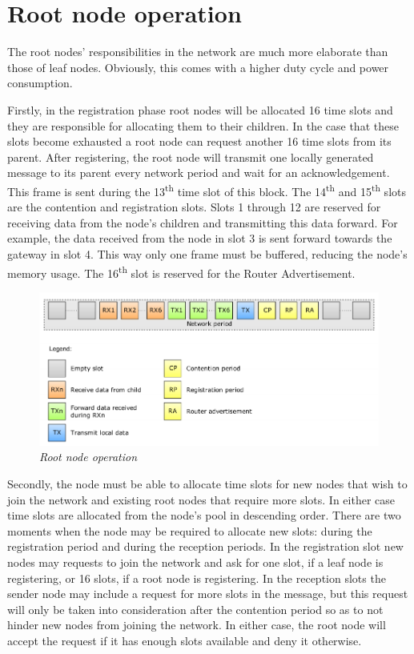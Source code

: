 \section{Root node operation}
\label{sec:root_node_operation}

The root nodes' responsibilities in the network are much more elaborate than
those of leaf nodes. Obviously, this comes with a higher duty cycle and power
consumption. 

Firstly, in the registration phase root nodes will be allocated 16 time slots
and they are responsible for allocating them to their children. In the case
that these slots become exhausted a root node can request another 16 time slots
from its parent. After registering, the root node will transmit one locally
generated message to its parent every network period and wait for an
acknowledgement. This frame is sent during the 13\textsuperscript{th} time slot
of this block. The 14\textsuperscript{th} and 15\textsuperscript{th} slots are
the contention and registration slots. Slots 1 through 12 are reserved for
receiving data from the node's children and transmitting this data forward. For
example, the data received from the node in slot 3 is sent forward towards the
gateway in slot 4. This way only one frame must be buffered, reducing the
node's memory usage. The 16\textsuperscript{th} slot is reserved for the Router
Advertisement.

\begin{figure}[ht]
	\begin{center}
		\includegraphics[width=\textwidth]{img/root_node_operation.pdf}
	\end{center}
	\caption{\small \itshape{Root node operation}}
\end{figure}

Secondly, the node must be able to allocate time slots for new nodes that wish
to join the network and existing root nodes that require more slots. In either
case time slots are allocated from the node's pool in descending order. There
are two moments when the node may be required to allocate new slots: during the
registration period and during the reception periods. In the registration slot
new nodes may requests to join the network and ask for one slot, if a leaf node
is registering, or 16 slots, if a root node is registering. In the reception
slots the sender node may include a request for more slots in the message, but
this request will only be taken into consideration after the contention period
so as to not hinder new nodes from joining the network. In either case, the
root node will accept the request if it has enough slots available and deny it
otherwise.  

